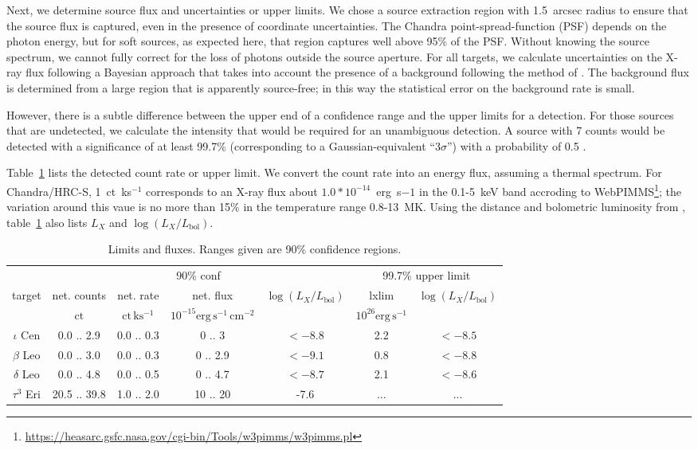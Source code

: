 \documentclass[preprint2]{aastex631}
\begin{document}
Next, we determine source flux and uncertainties or upper limits.
We chose a source extraction region with 1.5~arcsec
radius to ensure that the source flux is captured, even in the
presence of coordinate uncertainties. The Chandra
point-spread-function (PSF) depends on the photon energy, but for
soft sources, as expected here, that region captures well above 95\%
of the PSF. Without knowing the source spectrum, we cannot fully
correct for the loss of photons outside the source aperture. For all targets, we calculate
uncertainties on the X-ray flux following a Bayesian approach that
takes into account the presence of a background following the method of \citet{1991ApJ...374..344K}. The background flux is determined from
a large region that is apparently source-free; in this way the
statistical error on the background rate is small.


However, there is a subtle difference between the upper end of a
confidence range and the upper limits for a detection. For those
sources that are undetected, we calculate the intensity that would be
required for an unambiguous detection. A source with 7 counts would be
detected with a significance of at least 99.7\% (corresponding to a
Gaussian-equivalent ``$3\sigma$'') with a probability of 0.5
\citep{2010ApJ...719..900K}.



Table~\ref{tab:detections} lists the detected count rate or upper limit. We convert the count rate into an energy flux, assuming a thermal spectrum. For Chandra/HRC-S,
1~ct~ks$^{-1}$ corresponds to an X-ray flux about $1.0*10^{-14}$~erg~s${-1}$ in the 0.1-5~keV band accroding to WebPIMMS\footnote{\url{https://heasarc.gsfc.nasa.gov/cgi-bin/Tools/w3pimms/w3pimms.pl}}; the variation around this vaue is no more than 15\% in the temperature range 0.8-13~MK. Using the distance and bolometric luminosity from \citet{2002ApJ...579..800S}, table~\ref{tab:detections} also lists $L_X$ and $\log(L_X/L_\mathrm{bol})$.
\begin{table}
\caption{Limits and fluxes. Ranges given are 90\% confidence regions.\label{tab:detections}}
\begin{tabular}{ccccccc}
  \hline \hline
  & \multicolumn{4}{c}{90\% conf} & \multicolumn{2}{c}{99.7\% upper limit}\\
target & net. counts & net. rate & net. flux & $\log(L_X/L_\mathrm{bol})$ & lxlim & $\log(L_X/L_\mathrm{bol})$ \\
 & $\mathrm{ct}$ & $\mathrm{ct\,ks^{-1}}$ & $10^{-15}\mathrm{erg\,s^{-1}\,cm^{-2}}$ &  & $10^{26}\mathrm{erg\,s^{-1}}$ & $\mathrm{}$ \\
\hline
$\iota$ Cen & 0.0 ..  2.9 & 0.0 ..  0.3 & 0 ..   3 & $<-8.8$ & 2.2 & $<-8.5$ \\
$\beta$ Leo & 0.0 ..  3.0 & 0.0 ..  0.3 & 0 .. 2.9 & $<-9.1$ & 0.8 & $<-8.8$ \\
$\delta$ Leo & 0.0 ..  4.8 & 0.0 ..  0.5 & 0 .. 4.7 & $< -8.7$ & 2.1 & $<-8.6$ \\
$\tau^3$ Eri & 20.5 .. 39.8 & 1.0 ..  2.0 & 10 ..   20 & -7.6 & ... & ... \\
\hline
\end{tabular}
\end{table}
\end{document}
